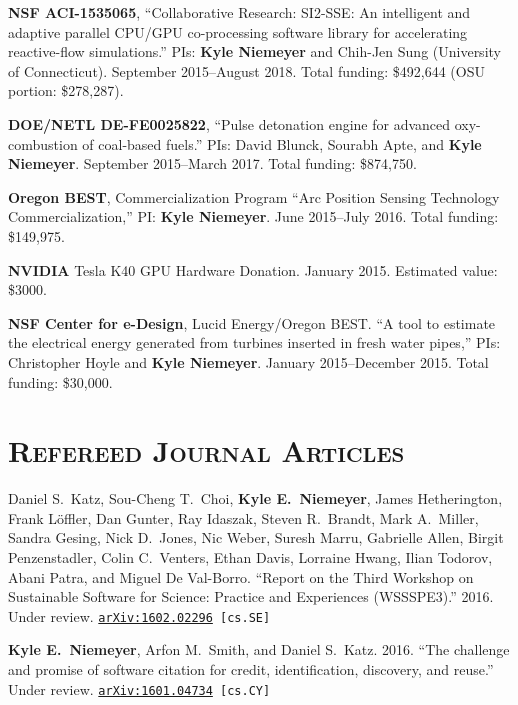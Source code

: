 \documentclass[margin,line,11pt]{res}
\makeatletter
\newlength{\bibhang}
\newlength{\bibsep}
 {\@listi \global\bibsep\itemsep \global\advance\bibsep by\parsep}
\newenvironment{bibenum*}
  {\renewcommand\labelenumi{\theenumi.}%
   \etaremune[
     topsep=0pt,
     itemsep=\bibsep,
     parsep=0pt,partopsep=0pt,
     itemindent=-\bibhang,
     leftmargin={\bibhang+\widthof{[999]}}]}
  {\endetaremune}
\makeatother
\begin{document}
\begin{resume}
\textbf{NSF ACI-1535065}, ``Collaborative Research: SI2-SSE: An intelligent and adaptive parallel CPU\slash GPU co-processing software library for accelerating reactive-flow simulations.'' PIs: \textbf{Kyle Niemeyer} and Chih-Jen Sung (University of Connecticut). September 2015--August 2018. Total funding: \$492,644 (OSU portion: \$278,287).

\textbf{DOE\slash NETL DE-FE0025822}, ``Pulse detonation engine for advanced oxy-combustion of coal-based fuels.'' PIs: David Blunck, Sourabh Apte, and \textbf{Kyle Niemeyer}. September 2015--March 2017. Total funding: \$874,750.

\textbf{Oregon BEST}, Commercialization Program ``Arc Position Sensing Technology Commercialization,'' PI: \textbf{Kyle Niemeyer}. June 2015--July 2016. Total funding: \$149,975.

\textbf{NVIDIA} Tesla K40 GPU Hardware Donation. January 2015. Estimated value: \$3000.

\textbf{NSF Center for e-Design}, Lucid Energy\slash Oregon BEST. ``A tool to estimate the electrical energy generated from turbines inserted in fresh water pipes,'' PIs: Christopher Hoyle and \textbf{Kyle Niemeyer}. January 2015--December 2015. Total funding: \$30,000.

\section{\textsc{Refereed Journal Articles}}

\begin{bibenum*}

\item Daniel S.~Katz, Sou-Cheng T.\ Choi, \textbf{Kyle E.\ Niemeyer}, James Hetherington, Frank L\"{o}ffler, Dan Gunter, Ray Idaszak, Steven R.\ Brandt, Mark A.\ Miller, Sandra Gesing, Nick D.\ Jones, Nic Weber, Suresh Marru, Gabrielle Allen, Birgit Penzenstadler, Colin C.\ Venters, Ethan Davis, Lorraine Hwang, Ilian Todorov, Abani Patra, and Miguel De Val-Borro.
``Report on the Third Workshop on Sustainable Software for Science: Practice and Experiences (WSSSPE3).''
2016.
Under review. {\tt \href{http://arxiv.org/abs/1602.02296}{arXiv:1602.02296} [cs.SE]}

\item \textbf{Kyle E.\ Niemeyer}, Arfon M.\ Smith, and Daniel S.\ Katz.
2016.
``The challenge and promise of software citation for credit, identification, discovery, and reuse.''
Under review. {\tt \href{http://arxiv.org/abs/1601.04734}{arXiv:1601.04734} [cs.CY]}


\end{bibenum*}
\end{resume}
\end{document}

